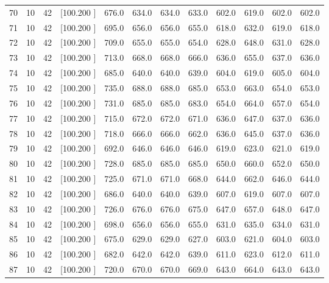 \documentclass[12pt,a4paper]{article}
\begin{document}
\begin{center}
{\begin{tabular}{r r r r r r r r r r r r}
  70& 10& 42&[100.200   ]&   676.0&   634.0&   634.0&   633.0&   602.0&   619.0&   602.0&   602.0\\[-0.02in]
  71& 10& 42&[100.200   ]&   695.0&   656.0&   656.0&   655.0&   618.0&   632.0&   619.0&   618.0\\[-0.02in]
  72& 10& 42&[100.200   ]&   709.0&   655.0&   655.0&   654.0&   628.0&   648.0&   631.0&   628.0\\[-0.02in]
  73& 10& 42&[100.200   ]&   713.0&   668.0&   668.0&   666.0&   636.0&   655.0&   637.0&   636.0\\[-0.02in]
  74& 10& 42&[100.200   ]&   685.0&   640.0&   640.0&   639.0&   604.0&   619.0&   605.0&   604.0\\[-0.02in]
  75& 10& 42&[100.200   ]&   735.0&   688.0&   688.0&   685.0&   653.0&   663.0&   654.0&   653.0\\[-0.02in]
  76& 10& 42&[100.200   ]&   731.0&   685.0&   685.0&   683.0&   654.0&   664.0&   657.0&   654.0\\[-0.02in]
  77& 10& 42&[100.200   ]&   715.0&   672.0&   672.0&   671.0&   636.0&   647.0&   637.0&   636.0\\[-0.02in]
  78& 10& 42&[100.200   ]&   718.0&   666.0&   666.0&   662.0&   636.0&   645.0&   637.0&   636.0\\[-0.02in]
  79& 10& 42&[100.200   ]&   692.0&   646.0&   646.0&   646.0&   619.0&   623.0&   621.0&   619.0\\[-0.02in]
  80& 10& 42&[100.200   ]&   728.0&   685.0&   685.0&   685.0&   650.0&   660.0&   652.0&   650.0\\[-0.02in]
  81& 10& 42&[100.200   ]&   725.0&   671.0&   671.0&   668.0&   644.0&   662.0&   646.0&   644.0\\[-0.02in]
  82& 10& 42&[100.200   ]&   686.0&   640.0&   640.0&   639.0&   607.0&   619.0&   607.0&   607.0\\[-0.02in]
  83& 10& 42&[100.200   ]&   726.0&   676.0&   676.0&   675.0&   647.0&   657.0&   648.0&   647.0\\[-0.02in]
  84& 10& 42&[100.200   ]&   698.0&   656.0&   656.0&   655.0&   631.0&   635.0&   634.0&   631.0\\[-0.02in]
  85& 10& 42&[100.200   ]&   675.0&   629.0&   629.0&   627.0&   603.0&   621.0&   604.0&   603.0\\[-0.02in]
  86& 10& 42&[100.200   ]&   682.0&   642.0&   642.0&   639.0&   611.0&   623.0&   612.0&   611.0\\[-0.02in]
  87& 10& 42&[100.200   ]&   720.0&   670.0&   670.0&   669.0&   643.0&   664.0&   643.0&   643.0\\[-0.02in]

\end{tabular}}
\end{center}
\end{document}
